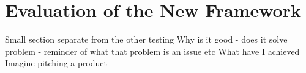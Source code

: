 \chapter{Evaluation of the New Framework}
Small section separate from the other testing
Why is it good
- does it solve problem - reminder of what that problem is an issue etc
What have I achieved
Imagine pitching a product
